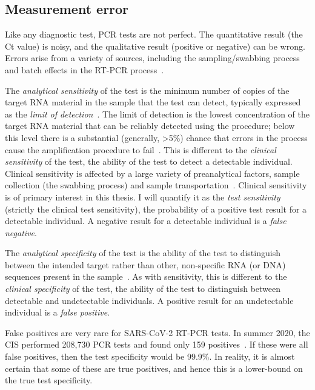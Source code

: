 \documentclass[thesis.tex]{subfiles}
\begin{document}
\subsection{Measurement error} \label{biology-data:sec:measurement-error}

Like any diagnostic test, PCR tests are not perfect.
The quantitative result (the Ct value) is noisy, and the qualitative result (positive or negative) can be wrong.
Errors arise from a variety of sources, including the sampling/swabbing process and batch effects in the RT-PCR process~\autocite{hanRTPCR}.

The \emph{analytical sensitivity} of the test is the minimum number of copies of the target RNA material in the sample that the test can detect, typically expressed as the \emph{limit of detection}~\autocite{bustinMIQE}.
The limit of detection is the lowest concentration of the target RNA material that can be reliably detected using the procedure; below this level there is a substantial (generally, >5\%) chance that errors in the process cause the amplification procedure to fail~\autocite{forootanLOD}.
This is different to the \emph{clinical sensitivity} of the test, the ability of the test to detect a detectable individual.
Clinical sensitivity is affected by a large variety of preanalytical factors, \eg sample collection (\ie the swabbing process) and sample transportation~\autocite{lippiPotential}.
Clinical sensitivity is of primary interest in this thesis.
I will quantify it as the \emph{test sensitivity} (strictly the clinical test sensitivity), the probability of a positive test result for a detectable individual.
A negative result for a detectable individual is a \emph{false negative}.

The \emph{analytical specificity} of the test is the ability of the test to distinguish between the intended target rather than other, non-specific RNA (or DNA) sequences present in the sample~\autocite{bustinMIQE}.
As with sensitivity, this is different to the \emph{clinical specificity} of the test, the ability of the test to distinguish between detectable and undetectable individuals.
A positive result for an undetectable individual is a \emph{false positive}.

False positives are very rare for SARS-CoV-2 RT-PCR tests.
In summer 2020, the CIS performed 208,730 PCR tests and found only 159 positives~\autocite[section 5]{cisMethodsONS}.
If these were all false positives, then the test specificity would be 99.9\%.
In reality, it is almost certain that some of these are true positives, and hence this is a lower-bound on the true test specificity.
\end{document}
